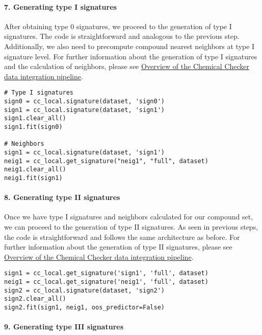 \paragraph{7. Generating type I signatures} \leavevmode

After obtaining type 0 signatures, we proceed to the generation of type I signatures. The code is straightforward and analogous to the previous step. Additionally, we also need to precompute compound nearest neighbors at type I signature level. For further information about the generation of type I signatures and the calculation of neighbors, please see \hyperref[Overview of the Chemical Checker data integration pipeline]{Overview of the Chemical Checker data integration pipeline}. \\

\begin{lstlisting}
# Type I signatures
sign0 = cc_local.signature(dataset, 'sign0')
sign1 = cc_local.signature(dataset, 'sign1')
sign1.clear_all()
sign1.fit(sign0)

# Neighbors
sign1 = cc_local.signature(dataset, 'sign1')
neig1 = cc_local.get_signature("neig1", "full", dataset)
neig1.clear_all()
neig1.fit(sign1)
\end{lstlisting}

\paragraph{8. Generating type II signatures} \leavevmode

Once we have type I signatures and neighbors calculated for our compound set, we can proceed to the generation of type II signatures. As seen in previous steps, the code is straightforward and follows the same architecture as before. For further information about the generation of type II signatures, please see \hyperref[Overview of the Chemical Checker data integration pipeline]{Overview of the Chemical Checker data integration pipeline}. \\

\begin{lstlisting}
sign1 = cc_local.get_signature('sign1', 'full', dataset)
neig1 = cc_local.get_signature('neig1', 'full', dataset)
sign2 = cc_local.signature(dataset, 'sign2')
sign2.clear_all()
sign2.fit(sign1, neig1, oos_predictor=False)
\end{lstlisting}


\paragraph{9. Generating type III signatures} \leavevmode

